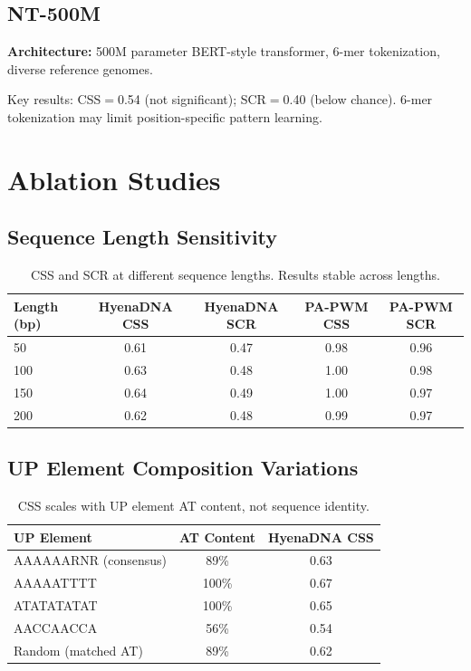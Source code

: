\documentclass{article}
\begin{document}
\subsection{NT-500M}

\textbf{Architecture:} 500M parameter BERT-style transformer, 6-mer tokenization, diverse
reference genomes.

Key results: CSS$=$0.54 (not significant); SCR$=$0.40 (below chance).
6-mer tokenization may limit position-specific pattern learning.

\section{Ablation Studies}
\label{app:ablations}

\subsection{Sequence Length Sensitivity}

\begin{table}[ht]
\caption{CSS and SCR at different sequence lengths. Results stable across lengths.}
\centering\small
\begin{tabular}{lcccc}
\toprule
Length (bp) & HyenaDNA CSS & HyenaDNA SCR & PA-PWM CSS & PA-PWM SCR \\
\midrule
 50 & 0.61 & 0.47 & 0.98 & 0.96 \\
100 & 0.63 & 0.48 & 1.00 & 0.98 \\
150 & 0.64 & 0.49 & 1.00 & 0.97 \\
200 & 0.62 & 0.48 & 0.99 & 0.97 \\
\bottomrule
\end{tabular}
\end{table}

\subsection{UP Element Composition Variations}

\begin{table}[ht]
\caption{CSS scales with UP element AT content, not sequence identity.}
\centering\small
\begin{tabular}{lcc}
\toprule
UP Element      & AT Content & HyenaDNA CSS \\
\midrule
AAAAAARNR (consensus) & 89\% & 0.63 \\
AAAAATTTT             & 100\% & 0.67 \\
ATATATATAT            & 100\% & 0.65 \\
AACCAACCA             & 56\%  & 0.54 \\
Random (matched AT)   & 89\%  & 0.62 \\
\bottomrule
\end{tabular}
\end{table}
\end{document}
